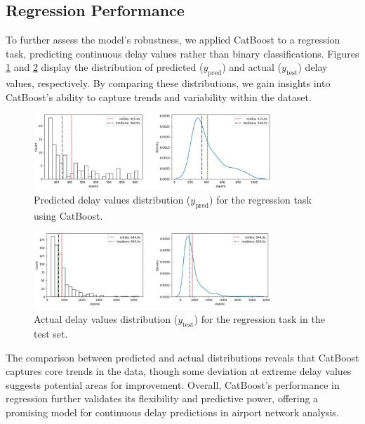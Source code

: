 \subsection{Regression Performance}

To further assess the model's robustness, we applied CatBoost to a
regression task, predicting continuous delay values rather than binary
classifications. Figures \ref{fig:y_pred} and \ref{fig:y_test} display
the distribution of predicted ($y_\text{pred}$) and actual
($y_\text{test}$) delay values, respectively. By comparing these
distributions, we gain insights into CatBoost’s ability to capture
trends and variability within the dataset.

\begin{figure}[!htbp]
    \centering
    \includegraphics[width=0.8\textwidth]{img/regression_catboost_ypred.pdf}
    \caption{Predicted delay values distribution ($y_\text{pred}$) for
    the regression task using CatBoost.}
    \label{fig:y_pred}
\end{figure}

\begin{figure}[!htbp]
    \centering
    \includegraphics[width=0.8\textwidth]{img/regression_catboost_ytest.pdf}
    \caption{Actual delay values distribution ($y_\text{test}$) for
    the regression task in the test set.}
    \label{fig:y_test}
\end{figure}

The comparison between predicted and actual distributions reveals that
CatBoost captures core trends in the data, though some deviation at
extreme delay values suggests potential areas for
improvement. Overall, CatBoost’s performance in regression further
validates its flexibility and predictive power, offering a promising
model for continuous delay predictions in airport network analysis.


